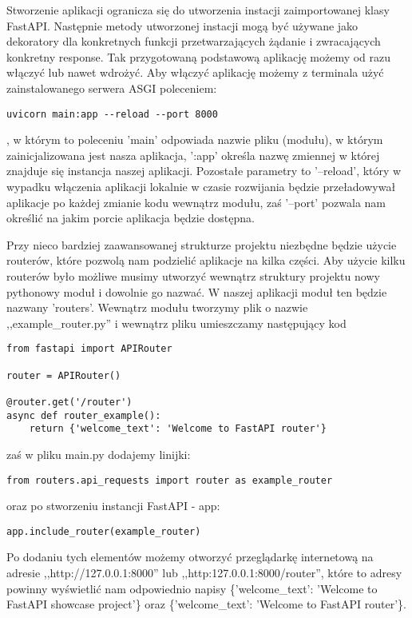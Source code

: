 Stworzenie aplikacji ogranicza się do utworzenia instacji zaimportowanej klasy FastAPI. Następnie metody utworzonej instacji mogą być używane jako dekoratory dla konkretnych funkcji przetwarzających żądanie i zwracających konkretny response. Tak przygotowaną podstawową aplikację możemy od razu włączyć lub nawet wdrożyć. Aby włączyć aplikację możemy z terminala użyć zainstalowanego serwera ASGI poleceniem:
\begin{lstlisting}
uvicorn main:app --reload --port 8000
\end{lstlisting}
, w którym to poleceniu 'main' odpowiada nazwie pliku (modułu), w którym zainicjalizowana jest nasza aplikacja, ':app' określa nazwę zmiennej w której znajduje się instancja naszej aplikacji. Pozostałe parametry to '--reload', który w wypadku włączenia aplikacji lokalnie w czasie rozwijania będzie przeładowywał aplikacje po każdej zmianie kodu wewnątrz modułu, zaś '--port' pozwala nam określić na jakim porcie aplikacja będzie dostępna.

Przy nieco bardziej zaawansowanej strukturze projektu niezbędne będzie użycie routerów, które pozwolą nam podzielić aplikacje na kilka części. Aby użycie kilku routerów było możliwe musimy utworzyć wewnątrz struktury projektu nowy pythonowy moduł i dowolnie go nazwać. W naszej aplikacji moduł ten będzie nazwany 'routers'. Wewnątrz modułu tworzymy plik o nazwie ,,example\_router.py'' i wewnątrz pliku umieszczamy następujący kod

\begin{lstlisting}
from fastapi import APIRouter

router = APIRouter()

@router.get('/router')
async def router_example():
    return {'welcome_text': 'Welcome to FastAPI router'}
\end{lstlisting}
zaś w pliku main.py dodajemy linijki:
\begin{lstlisting}
from routers.api_requests import router as example_router
\end{lstlisting}
oraz po stworzeniu instancji FastAPI - app:
\begin{lstlisting}
app.include_router(example_router)
\end{lstlisting}
Po dodaniu tych elementów możemy otworzyć przeglądarkę internetową na adresie ,,http://127.0.0.1:8000'' lub ,,http:127.0.0.1:8000/router'', które to adresy powinny wyświetlić nam odpowiednio napisy \{'welcome\_text': 'Welcome to FastAPI showcase project'\} oraz \{'welcome\_text': 'Welcome to FastAPI router'\}.

